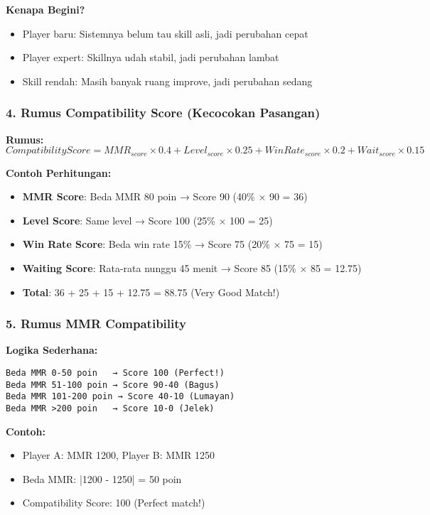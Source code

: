 \documentclass[12pt]{article}
\begin{document}
\textbf{Kenapa Begini?}
\begin{itemize}
    \item Player baru: Sistemnya belum tau skill asli, jadi perubahan cepat
    \item Player expert: Skillnya udah stabil, jadi perubahan lambat
    \item Skill rendah: Masih banyak ruang improve, jadi perubahan sedang
\end{itemize}

\subsubsection{4. Rumus Compatibility Score (Kecocokan Pasangan)}

\textbf{Rumus:}
\begin{equation}
CompatibilityScore = MMR_{score} \times 0.4 + Level_{score} \times 0.25 + WinRate_{score} \times 0.2 + Wait_{score} \times 0.15
\end{equation}

\textbf{Contoh Perhitungan:}
\begin{itemize}
    \item \textbf{MMR Score}: Beda MMR 80 poin → Score 90 (40\% × 90 = 36)
    \item \textbf{Level Score}: Same level → Score 100 (25\% × 100 = 25)
    \item \textbf{Win Rate Score}: Beda win rate 15\% → Score 75 (20\% × 75 = 15)
    \item \textbf{Waiting Score}: Rata-rata nunggu 45 menit → Score 85 (15\% × 85 = 12.75)
    \item \textbf{Total}: 36 + 25 + 15 + 12.75 = 88.75 (Very Good Match!)
\end{itemize}

\subsubsection{5. Rumus MMR Compatibility}

\textbf{Logika Sederhana:}
\begin{lstlisting}[language=text, caption=MMR Compatibility Logic]
Beda MMR 0-50 poin   → Score 100 (Perfect!)
Beda MMR 51-100 poin → Score 90-40 (Bagus)
Beda MMR 101-200 poin → Score 40-10 (Lumayan)
Beda MMR >200 poin   → Score 10-0 (Jelek)
\end{lstlisting}

\textbf{Contoh:}
\begin{itemize}
    \item Player A: MMR 1200, Player B: MMR 1250
    \item Beda MMR: |1200 - 1250| = 50 poin
    \item Compatibility Score: 100 (Perfect match!)
\end{itemize}
\end{document}
